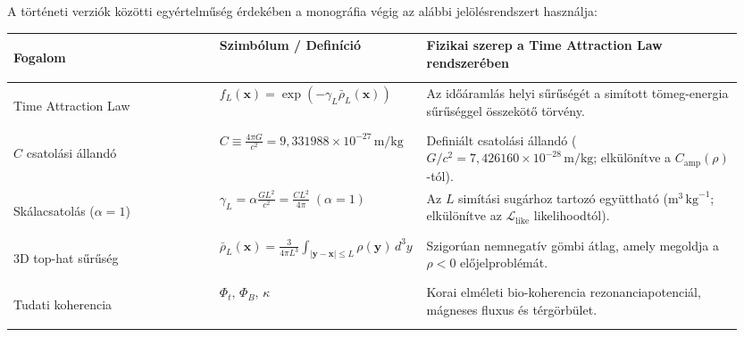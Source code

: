 \documentclass[10pt,a4paper]{article}
\begin{document}
\vspace{3mm}
\par
A t\"ort\'eneti verzi\'ok k\"oz\"otti egy\'ertelm\H{u}s\'eg \'erdek\'eben a monogr\'afia v\'egig az al\'abbi jel\"ol\'esrendszert haszn\'alja:
\begin{center}\vspace{-2pt}
{\footnotesize
\begin{tabular}{@{}>{\bfseries\raggedright\arraybackslash}p{0.28\linewidth}>{\raggedright\arraybackslash}p{0.24\linewidth}>{\raggedright\arraybackslash}p{0.43\linewidth}@{}}
\toprule
Fogalom & Szimb\'olum / Defin\'ici\'o & Fizikai szerep a Time Attraction Law rendszer\'eben \\
\midrule
Time Attraction Law & $f_L(\mathbf{x}) = \exp(-\gamma_L \bar{\rho}_L(\mathbf{x}))$ & Az id\H{o}\'araml\'as helyi s\H{u}r\H{u}s\'eg\'et a sim\'itott t\"omeg-energia s\H{u}r\H{u}s\'eggel \"osszek\"ot\H{o} t\"orv\'eny. \\
$C$ csatol\'asi \'alland\'o & $C \equiv \frac{4\pi G}{c^2} = 9{,}331988\times 10^{-27}\,\text{m/kg}$ & Defini\'alt csatol\'asi \'alland\'o ($G/c^2 = 7{,}426160\times 10^{-28}\,\text{m/kg}$; elk\"ul\"on\'itve a $C_{\text{amp}}(\rho)$-t\'ol). \\
Sk\'alacsatol\'as ($\alpha=1$) & $\gamma_L = \alpha\frac{G L^2}{c^2} = \frac{C L^2}{4\pi}\;(\alpha=1)$ & Az $L$ sim\'it\'asi sug\'arhoz tartoz\'o egy\"utthat\'o ($\text{m}^3\,\text{kg}^{-1}$; elk\"ul\"on\'itve az $\mathcal{L}_{\text{like}}$ likelihoodt\'ol). \\
3D top-hat s\H{u}r\H{u}s\'eg & $\bar{\rho}_L(\mathbf{x}) = \frac{3}{4\pi L^3}\int_{|\mathbf{y}-\mathbf{x}|\le L}\rho(\mathbf{y})\,d^3y$ & Szigor\'uan nemnegat\'iv g\"ombi \'atlag, amely megoldja a $\rho<0$ el\H{o}jelprobl\'em\'at. \\
Tudati koherencia & $\Phi_t,\,\Phi_B,\,\kappa$ & Korai elm\'eleti bio-koherencia rezonanciapotenci\'al, m\'agneses fluxus \'es t\'erg\"orb\"ulet. \\
\bottomrule
\end{tabular}}
\end{center}
\end{document}
